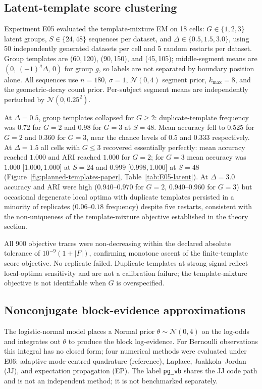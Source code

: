 

\FloatBarrier
\subsection{Latent-template score clustering}
Experiment E05 evaluated the template-mixture EM on 18 cells: $G\in\{1,2,3\}$ latent groups, $S\in\{24,48\}$ sequences per dataset, and $\Delta\in\{0.5,1.5,3.0\}$, using 50 independently generated datasets per cell and 5 random restarts per dataset. Group templates are (60,\,120), (90,\,150), and (45,\,105); middle-segment means are $(0,\,(-1)^g\Delta,\,0)$ for group $g$, so labels are not separated by boundary position alone. All sequences use $n=180$, $\sigma=1$, $\mathcal{N}(0,4)$ segment prior, $k_{\max}=8$, and the geometric-decay count prior. Per-subject segment means are independently perturbed by $\mathcal{N}(0,0.25^2)$.

At $\Delta=0.5$, group templates collapsed for $G\geq2$: duplicate-template frequency was $0.72$ for $G=2$ and $0.98$ for $G=3$ at $S=48$. Mean accuracy fell to $0.525$ for $G=2$ and $0.360$ for $G=3$, near the chance levels of $0.5$ and $0.333$ respectively. At $\Delta=1.5$ all cells with $G\leq3$ recovered essentially perfectly: mean accuracy reached $1.000$ and ARI reached $1.000$ for $G=2$; for $G=3$ mean accuracy was $1.000$ [1.000,\,1.000] at $S=24$ and $0.999$ [0.998,\,1.000] at $S=48$ (Figure~\ref{fig:planned-templates-paper}, Table~\ref{tab:E05-latent}). At $\Delta=3.0$ accuracy and ARI were high ($0.940$--$0.970$ for $G=2$, $0.940$--$0.960$ for $G=3$) but occasional degenerate local optima with duplicate templates persisted in a minority of replicates ($0.06$--$0.18$ frequency) despite five restarts, consistent with the non-uniqueness of the template-mixture objective established in the theory section.

All 900 objective traces were non-decreasing within the declared absolute tolerance of $10^{-9}(1+|F|)$, confirming monotone ascent of the finite-template score objective. No replicate failed. Duplicate templates at strong signal reflect local-optima sensitivity and are not a calibration failure; the template-mixture objective is not identifiable when $G$ is overspecified.





\FloatBarrier
\subsection{Nonconjugate block-evidence approximations}
The logistic-normal model places a Normal prior $\theta\sim\mathcal{N}(0,4)$ on the
log-odds and integrates out $\theta$ to produce the block log-evidence.
For Bernoulli observations this integral has no closed form; four numerical methods
were evaluated under E06: adaptive mode-centred quadrature (reference),
Laplace, Jaakkola--Jordan (JJ), and expectation propagation (EP).
The label \texttt{pg\_vb} shares the JJ code path and is not an independent method;
it is not benchmarked separately.

